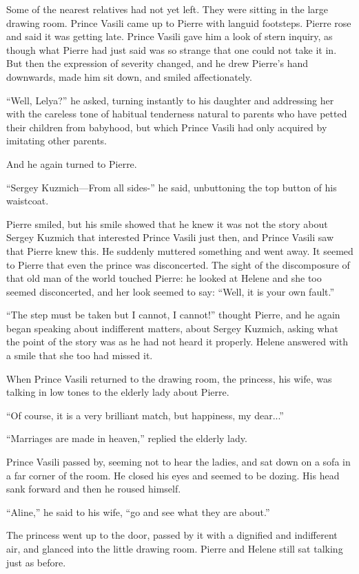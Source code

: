 Some of the nearest relatives had not yet left. They were sitting
in the large drawing room. Prince Vasili came up to Pierre with
languid footsteps. Pierre rose and said it was getting
late. Prince Vasili gave him a look of stern inquiry, as though
what Pierre had just said was so strange that one could not take
it in. But then the expression of severity changed, and he drew
Pierre's hand downwards, made him sit down, and smiled
affectionately.

``Well, Lelya?'' he asked, turning instantly to his daughter and
addressing her with the careless tone of habitual tenderness
natural to parents who have petted their children from babyhood,
but which Prince Vasili had only acquired by imitating other
parents.

And he again turned to Pierre.

``Sergey Kuzmich---From all sides-'' he said, unbuttoning the top
button of his waistcoat.

Pierre smiled, but his smile showed that he knew it was not the
story about Sergey Kuzmich that interested Prince Vasili just
then, and Prince Vasili saw that Pierre knew this. He suddenly
muttered something and went away. It seemed to Pierre that even
the prince was disconcerted.  The sight of the discomposure of
that old man of the world touched Pierre: he looked at Helene and
she too seemed disconcerted, and her look seemed to say: ``Well,
it is your own fault.''

``The step must be taken but I cannot, I cannot!'' thought
Pierre, and he again began speaking about indifferent matters,
about Sergey Kuzmich, asking what the point of the story was as
he had not heard it properly.  Helene answered with a smile that
she too had missed it.

When Prince Vasili returned to the drawing room, the princess,
his wife, was talking in low tones to the elderly lady about
Pierre.

``Of course, it is a very brilliant match, but happiness, my
dear...''

``Marriages are made in heaven,'' replied the elderly lady.

Prince Vasili passed by, seeming not to hear the ladies, and sat
down on a sofa in a far corner of the room. He closed his eyes
and seemed to be dozing. His head sank forward and then he roused
himself.

``Aline,'' he said to his wife, ``go and see what they are
about.''

The princess went up to the door, passed by it with a dignified
and indifferent air, and glanced into the little drawing
room. Pierre and Helene still sat talking just as before.

